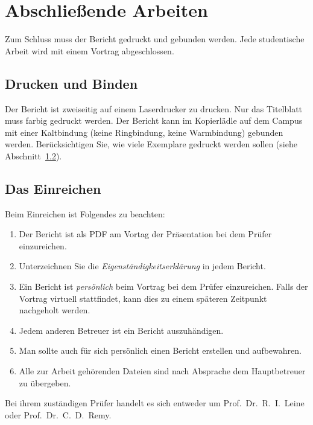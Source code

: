 \chapter{Abschlie{\ss}ende Arbeiten}\label{chap:AbschliessendeArbeiten}

Zum Schluss muss der Bericht gedruckt und gebunden werden. Jede studentische Arbeit wird mit einem Vortrag abgeschlossen.

	
\section{Drucken und Binden}
Der Bericht ist zweiseitig auf einem Laserdrucker zu drucken. Nur das Titelblatt muss farbig gedruckt werden.  
Der Bericht kann im Kopierlädle auf dem Campus mit einer Kaltbindung (keine Ringbindung, keine Warmbindung) gebunden werden. 
Berücksichtigen Sie, wie viele Exemplare gedruckt werden sollen (siehe Abschnitt~\ref{sec:Einreichen}).

\section{Das Einreichen}\label{sec:Einreichen}
Beim Einreichen ist Folgendes zu beachten:
\begin{enumerate}
 \item Der Bericht ist als PDF am Vortag der Präsentation bei dem Prüfer einzureichen.
 \item Unterzeichnen Sie die \emph{Eigenständigkeitserklärung} in jedem Bericht.
 \item Ein Bericht ist \emph{persönlich} beim Vortrag bei dem Prüfer einzureichen. Falls der Vortrag virtuell stattfindet, kann dies zu einem späteren Zeitpunkt nachgeholt werden.
 \item Jedem anderen Betreuer ist ein Bericht auszuhändigen.
 \item Man sollte auch für sich persönlich einen Bericht erstellen und aufbewahren.
 \item Alle zur Arbeit gehörenden Dateien sind nach Absprache dem Hauptbetreuer zu übergeben.
\end{enumerate}
Bei ihrem zuständigen Prüfer handelt es sich entweder um Prof.~Dr.~R.~I.~Leine oder Prof.~Dr.~C.~D.~Remy.

